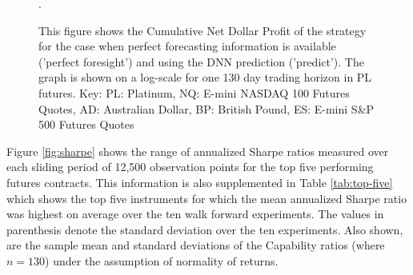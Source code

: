 \documentclass{article}
\begin{document}
\begin{figure}[H]
	\vspace{-20pt}
	\caption{This figure shows the Cumulative Net Dollar Profit of the strategy for the case when perfect forecasting information is available ('perfect foresight') and using the DNN prediction ('predict').  The graph is shown on a log-scale for one 130 day trading horizon in PL futures. Key: PL: Platinum, NQ: E-mini NASDAQ 100 Futures Quotes, AD: Australian Dollar, BP: British Pound, ES: E-mini S\&P 500 Futures Quotes}.
	\label{fig:pnl}
\end{figure}

Figure \ref{fig:sharpe} shows the range of annualized Sharpe ratios measured over each sliding period of 12,500 observation points for the top five performing futures contracts. This information is also supplemented in Table \ref{tab:top-five} which shows the top five instruments for which the mean annualized Sharpe ratio was highest on average over the ten walk forward experiments. The values in parenthesis denote the standard deviation over the ten experiments. Also shown, are the sample mean and standard deviations of the Capability ratios (where $n=130$) under the assumption of normality of returns. 
\end{document}

